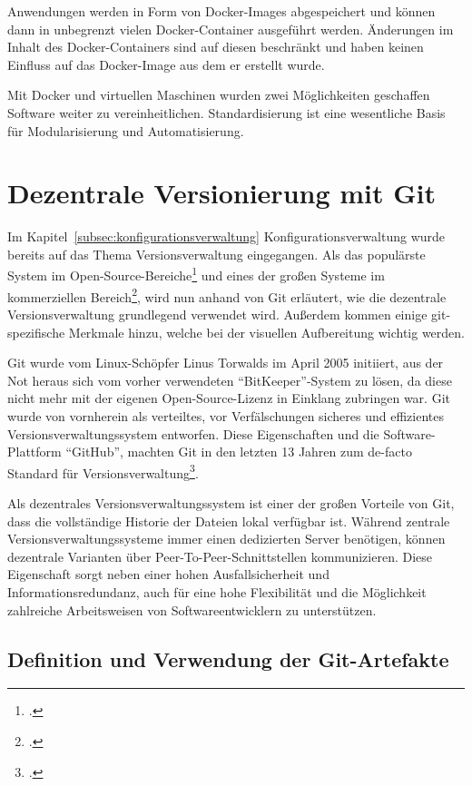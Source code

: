 Anwendungen werden in Form von Docker-Images abgespeichert und können dann in unbegrenzt vielen Docker-Container ausgeführt werden. Änderungen im Inhalt des Docker-Containers sind auf diesen beschränkt und haben keinen Einfluss auf das Docker-Image aus dem er erstellt wurde.

Mit Docker und virtuellen Maschinen wurden zwei Möglichkeiten geschaffen Software weiter zu vereinheitlichen. Standardisierung ist eine wesentliche Basis für Modularisierung und Automatisierung.

\section{Dezentrale Versionierung mit Git}

Im Kapitel~\ref{subsec:konfigurationsverwaltung} Konfigurationsverwaltung wurde bereits auf das Thema Versionsverwaltung 
eingegangen. Als das populärste System im Open-Source-Bereiche\footcite{openhub-pie-chart} und eines der großen Systeme 
im kommerziellen Bereich\footcite{g2crowd2018}, wird nun anhand von Git erläutert, wie die dezentrale Versionsverwaltung 
grundlegend verwendet wird. Außerdem kommen einige git-spezifische Merkmale hinzu, welche bei der visuellen Aufbereitung 
wichtig werden.

Git wurde vom Linux-Schöpfer Linus Torwalds im April 2005 initiiert, aus der Not heraus sich vom vorher verwendeten 
``BitKeeper''-System zu lösen, da diese nicht mehr mit der eigenen Open-Source-Lizenz in Einklang zubringen war. Git 
wurde von vornherein als verteiltes, vor Verfälschungen sicheres und effizientes Versionsverwaltungssystem entworfen. 
Diese Eigenschaften und die Software-Plattform ``GitHub'', machten Git in den letzten 13 Jahren zum de-facto Standard für 
Versionsverwaltung\footcite{heise-torvald-git2015}.

Als dezentrales Versionsverwaltungssystem ist einer der großen Vorteile von Git, dass die vollständige Historie der 
Dateien lokal verfügbar ist. Während zentrale Versionsverwaltungssysteme immer einen dedizierten Server benötigen, können 
dezentrale Varianten über Peer-To-Peer-Schnittstellen kommunizieren. Diese Eigenschaft sorgt neben einer hohen 
Ausfallsicherheit und Informationsredundanz, auch für eine hohe Flexibilität und die Möglichkeit zahlreiche Arbeitsweisen 
von Softwareentwicklern zu unterstützen.

\subsection{Definition und Verwendung der Git-Artefakte}

